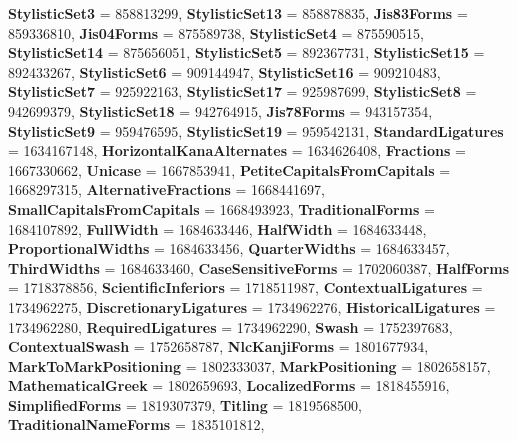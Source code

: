 \begin{DoxyCompactItemize}
{\bfseries Stylistic\+Set3} = 858813299, 
{\bfseries Stylistic\+Set13} = 858878835, 
{\bfseries Jis83\+Forms} = 859336810, 
\newline
{\bfseries Jis04\+Forms} = 875589738, 
{\bfseries Stylistic\+Set4} = 875590515, 
{\bfseries Stylistic\+Set14} = 875656051, 
{\bfseries Stylistic\+Set5} = 892367731, 
\newline
{\bfseries Stylistic\+Set15} = 892433267, 
{\bfseries Stylistic\+Set6} = 909144947, 
{\bfseries Stylistic\+Set16} = 909210483, 
{\bfseries Stylistic\+Set7} = 925922163, 
\newline
{\bfseries Stylistic\+Set17} = 925987699, 
{\bfseries Stylistic\+Set8} = 942699379, 
{\bfseries Stylistic\+Set18} = 942764915, 
{\bfseries Jis78\+Forms} = 943157354, 
\newline
{\bfseries Stylistic\+Set9} = 959476595, 
{\bfseries Stylistic\+Set19} = 959542131, 
{\bfseries Standard\+Ligatures} = 1634167148, 
{\bfseries Horizontal\+Kana\+Alternates} = 1634626408, 
\newline
{\bfseries Fractions} = 1667330662, 
{\bfseries Unicase} = 1667853941, 
{\bfseries Petite\+Capitals\+From\+Capitals} = 1668297315, 
{\bfseries Alternative\+Fractions} = 1668441697, 
\newline
{\bfseries Small\+Capitals\+From\+Capitals} = 1668493923, 
{\bfseries Traditional\+Forms} = 1684107892, 
{\bfseries Full\+Width} = 1684633446, 
{\bfseries Half\+Width} = 1684633448, 
\newline
{\bfseries Proportional\+Widths} = 1684633456, 
{\bfseries Quarter\+Widths} = 1684633457, 
{\bfseries Third\+Widths} = 1684633460, 
{\bfseries Case\+Sensitive\+Forms} = 1702060387, 
\newline
{\bfseries Half\+Forms} = 1718378856, 
{\bfseries Scientific\+Inferiors} = 1718511987, 
{\bfseries Contextual\+Ligatures} = 1734962275, 
{\bfseries Discretionary\+Ligatures} = 1734962276, 
\newline
{\bfseries Historical\+Ligatures} = 1734962280, 
{\bfseries Required\+Ligatures} = 1734962290, 
{\bfseries Swash} = 1752397683, 
{\bfseries Contextual\+Swash} = 1752658787, 
\newline
{\bfseries Nlc\+Kanji\+Forms} = 1801677934, 
{\bfseries Mark\+To\+Mark\+Positioning} = 1802333037, 
{\bfseries Mark\+Positioning} = 1802658157, 
{\bfseries Mathematical\+Greek} = 1802659693, 
\newline
{\bfseries Localized\+Forms} = 1818455916, 
{\bfseries Simplified\+Forms} = 1819307379, 
{\bfseries Titling} = 1819568500, 
{\bfseries Traditional\+Name\+Forms} = 1835101812, 

\end{DoxyCompactItemize}
